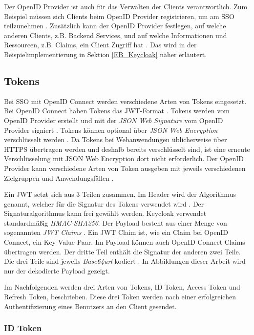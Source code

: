 Der OpenID Provider ist auch für das Verwalten der Clients verantwortlich. Zum Beispiel müssen sich Clients beim OpenID Provider registrieren, um am SSO teilzunehmen \cite[Client Registration]{EB26} \cite{EB57}. Zusätzlich kann der OpenID Provider festlegen, auf welche anderen Clients, z.B. Backend Services, und auf welche Informationen und Ressourcen, z.B. Claims, ein Client Zugriff hat \cite[Audience Support]{SSEB_keycloakDocs} \cite[ID Token]{EB4}. Das wird in der Beispielimplementierung in Sektion \ref{EB_Keycloak} näher erläutert.

\subsection{Tokens} \label{EB_Tokens}

Bei SSO mit OpenID Connect werden verschiedene Arten von Tokens eingesetzt. Bei OpenID Connect haben Tokens das JWT-Format \cite{SSEB_RFC7519}. Tokens werden vom OpenID Provider erstellt und mit der \textit{JSON Web Signature} vom OpenID Provider signiert \cite{EB5}. Tokens können optional über \textit{JSON Web Encryption} verschlüsselt werden \cite{EB5}. Da Tokens bei Webanwendungen üblicherweise über HTTPS übertragen werden und deshalb bereits verschlüsselt sind, ist eine erneute Verschlüsselung mit JSON Web Encryption dort nicht erforderlich. Der OpenID Provider kann verschiedene Arten von Token ausgeben mit jeweils verschiedenen Zielgruppen und Anwendungsfällen \cite[Token Endpoint]{EB4}.

Ein JWT setzt sich aus 3 Teilen zusammen. Im Header wird der Algorithmus genannt, welcher für die Signatur des Tokens verwendet wird \cite{EB5}. Der Signaturalgorithmus kann frei gewählt werden. Keycloak verwendet standardmäßig \textit{HMAC-SHA256}. Der Payload besteht aus einer Menge von sogenannten \textit{JWT Claims} \cite{EB5}. Ein JWT Claim ist, wie ein Claim bei OpenID Connect, ein Key-Value Paar. Im Payload können auch OpenID Connect Claims übertragen werden. Der dritte Teil enthält die Signatur der anderen zwei Teile. Die drei Teile sind jeweils \textit{Base64url} kodiert \cite{EB5}. In Abbildungen dieser Arbeit wird nur der dekodierte Payload gezeigt.

Im Nachfolgenden werden drei Arten von Tokens, ID Token, Access Token und Refresh Token, beschrieben. Diese drei Token werden nach einer erfolgreichen Authentifizierung eines Benutzers an den Client gesendet.

\subsubsection{ID Token}

